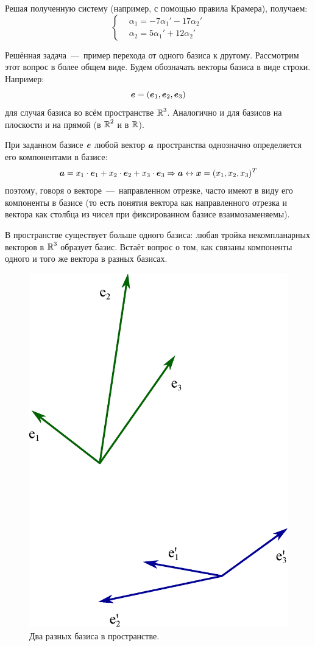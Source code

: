 \documentclass[a4paper,12pt]{article}
\begin{document}
\begin{solution}
  Решая полученную систему (например, с помощью правила Крамера), получаем:
  \[
    \left\{
      \begin{aligned}
        &\alpha_1 = -7 \alpha_1' - 17 \alpha_2'\\
        &\alpha_2 = 5 \alpha_1' + 12 \alpha_2'
      \end{aligned}
    \right.
  \]
  \end{solution}
  
  Решённая задача~---~пример перехода от одного базиса к другому.
  Рассмотрим этот вопрос в более общем виде.
  Будем обозначать векторы базиса в виде строки.
  Например:
  \[
    \bds e \hm= (\bds e_1, \bds e_2, \bds e_3)
  \]
  для случая базиса во всём пространстве $\operatorname{\mathbb R}^3$.
  Аналогично и для базисов на плоскости и на прямой (в $\operatorname{\mathbb R}^2$ и в $\operatorname{\mathbb R}$).
  
  При заданном базисе $\boldsymbol e$ любой вектор $\boldsymbol a$ пространства однозначно определяется его компонентами в базисе:
  \[
    \boldsymbol a = x_1 \cdot \boldsymbol e_1 + x_2 \cdot \boldsymbol e_2 + x_3 \cdot \boldsymbol e_3
      \Rightarrow \boldsymbol a \leftrightarrow \boldsymbol x = (x_1, x_2, x_3)^T
  \]
  поэтому, говоря о векторе~---~направленном отрезке, часто имеют в виду его компоненты в базисе (то есть понятия вектора как направленного отрезка и вектора как столбца из чисел при фиксированном базисе взаимозаменяемы).
  
  В пространстве существует больше одного базиса: любая тройка некомпланарных векторов в $\operatorname{\mathbb R}^3$ образует базис.
  Встаёт вопрос о том, как связаны компоненты одного и того же вектора в разных базисах.
  
  \begin{figure}[h]
    \centering
    
    \includegraphics[width=0.5\columnwidth]{two-basises}
    
    \caption{Два разных базиса в пространстве.}
    \label{fig:two-basises}
  \end{figure}
  
\end{document}
